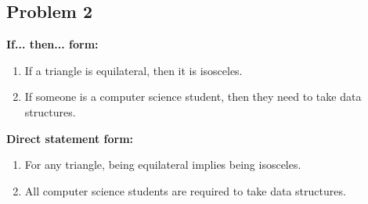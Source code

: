 \documentclass[a4paper, 10pt]{article}
\begin{document}
    \subsection{Problem 2}
        \textbf{If... then... form:}
            \begin{enumerate}
                \item If a triangle is equilateral, then it is isosceles.
                \item If someone is a computer science student, then they need to take data structures.
            \end{enumerate}

        \noindent \textbf{Direct statement form:}
            \begin{enumerate}
                \item For any triangle, being equilateral implies being isosceles.
                \item All computer science students are required to take data structures.
            \end{enumerate}
\end{document}
